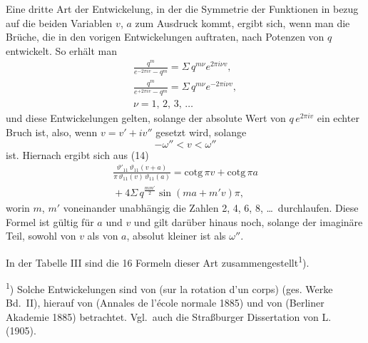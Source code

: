 Eine dritte Art der Entwickelung, in der die Symmetrie der
Funktionen in bezug auf die beiden Variablen $v$, $a$ zum Ausdruck
kommt, ergibt sich, wenn man die Brüche, die in den vorigen
Entwickelungen auftraten, nach Potenzen von $q$ entwickelt. So
erhält man
\[
\begin{gathered}
\frac{q^m}{e^{-2\pi i v}-q^m} = \Sigma\, q^{m\nu} e^{2\pi i \nu v}, \\
\frac{q^m}{e^{+2\pi i v}-q^m} = \Sigma\, q^{m\nu} e^{-2\pi i \nu v}, \\
\nu = 1,\, 2,\, 3,\, \ldots
\end{gathered}
\]
und diese Entwickelungen gelten, solange der absolute Wert
von $q\, e^{2\pi i v}$ ein echter Bruch ist, also, wenn $v = v' + i v''$ gesetzt
wird, solange
\[
-\omega'' < v < \omega'' %
\]
ist. Hiernach ergibt sich aus (14)
\[
\begin{gathered}
\frac{\vartheta'_{11}\,\vartheta_{11}(v+a)}{\pi\,\vartheta_{11}(v)\,\vartheta_{11}(a)} = \mathrm{cotg}\,\pi v + \mathrm{cotg}\,\pi a \\
{}+ 4\Sigma\, q^{\frac{mm'}{2}} \sin(m a + m' v)\pi,
\end{gathered}
\]
worin $m$, $m'$ voneinander unabhängig die  Zahlen
2, 4, 6, 8, \ldots\ durchlaufen. Diese Formel ist gültig für 
$a$ und $v$ und gilt darüber hinaus noch, solange der imaginäre
Teil, sowohl von $v$ als von $a$, absolut kleiner ist als $\omega''$.

In der Tabelle III sind die 16 Formeln dieser Art zusammengestellt\textsuperscript{1}).

\textsuperscript{1}) Solche Entwickelungen sind von  (sur la rotation d'un corps)
(ges. Werke Bd.\ II), hierauf von  (Annales de l'école normale 1885)
und von  (Berliner Akademie 1885) betrachtet. Vgl.\ auch die
Straßburger Dissertation von L.\  (1905).
